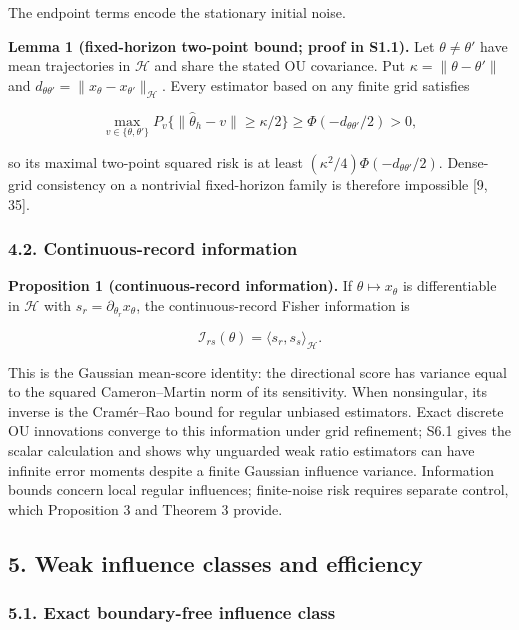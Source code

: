 \documentclass[
  american,
  11pt,
]{article}
\begin{document}
The endpoint terms encode the stationary initial noise.

\textbf{Lemma 1 (fixed-horizon two-point bound; proof in S1.1).} Let
\(\theta\ne\theta'\) have mean trajectories in \(\mathcal H\) and share
the stated OU covariance. Put \(\kappa=\|\theta-\theta'\|\) and
\(d_{\theta\theta'}=\|x_\theta-x_{\theta'}\|_{\mathcal H}\). Every
estimator based on any finite grid satisfies

\[
\max_{v\in\{\theta,\theta'\}}P_v\{\|\widehat\theta_h-v\|\geq\kappa/2\}
\geq\Phi(-d_{\theta\theta'}/2)>0,
\]

so its maximal two-point squared risk is at least
\((\kappa^2/4)\Phi(-d_{\theta\theta'}/2)\). Dense-grid consistency on a
nontrivial fixed-horizon family is therefore impossible {[}9, 35{]}.

\subsubsection{4.2. Continuous-record
information}\label{continuous-record-information}

\textbf{Proposition 1 (continuous-record information).} If
\(\theta\mapsto x_\theta\) is differentiable in \(\mathcal H\) with
\(s_r=\partial_{\theta_r}x_\theta\), the continuous-record Fisher
information is

\[
\mathcal I_{rs}(\theta)=\langle s_r,s_s\rangle_{\mathcal H}.
\]

This is the Gaussian mean-score identity: the directional score has
variance equal to the squared Cameron--Martin norm of its sensitivity.
When nonsingular, its inverse is the Cramér--Rao bound for regular
unbiased estimators. Exact discrete OU innovations converge to this
information under grid refinement; S6.1 gives the scalar calculation and
shows why unguarded weak ratio estimators can have infinite error
moments despite a finite Gaussian influence variance. Information bounds
concern local regular influences; finite-noise risk requires separate
control, which Proposition 3 and Theorem 3 provide.

\subsection{5. Weak influence classes and
efficiency}\label{weak-influence-classes-and-efficiency}

\subsubsection{5.1. Exact boundary-free influence
class}\label{exact-boundary-free-influence-class}
\end{document}
